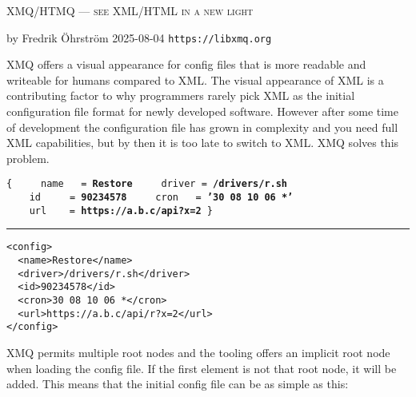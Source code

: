 \documentclass[10pt,a4paper]{article}
\newcommand{\xmqEN}[1]{{\color{xmqEN}#1}}
\newcommand{\xmqEK}[1]{{\color{xmqEK}#1}}
\newcommand{\xmqEKV}[1]{{\color{xmqEKV}\textbf{#1}}}
\newcommand{\xmqI}[0]{{\mbox{\ }}}
\begin{document}
{\flushleft
{\textsc{\Large XMQ/HTMQ --- see XML/HTML in a new light}}

by Fredrik Öhrström 2025-08-04 \hfill \texttt{https://libxmq.org}
}

{\flushleft{\large\textsc{\color{Red}{Rationale}}}} XMQ offers a visual
appearance for config files that is more readable and writeable for humans compared
to XML. The visual appearance of XML is a contributing factor to why programmers
rarely pick XML as the initial configuration file format for newly developed software.
However after some time of development the configuration file has grown in complexity
and you need full XML capabilities, but by then it is too late to switch to XML. XMQ solves this problem.

\begin{minipage}[b][27mm][b]{6cm}
\texttt{\flushleft\noindent \xmqEN{config}\xmqI \{\linebreak
\xmqI \xmqI \xmqI \xmqI \xmqEK{name}\xmqI \xmqI \xmqI =\xmqI \xmqEKV{Restore}\linebreak
\xmqI \xmqI \xmqI \xmqI \xmqEK{driver}\xmqI =\xmqI \xmqEKV{/drivers/r.sh}\linebreak
\xmqI \xmqI \xmqI \xmqI \xmqEK{id}\xmqI \xmqI \xmqI \xmqI \xmqI =\xmqI \xmqEKV{90234578}\linebreak
\xmqI \xmqI \xmqI \xmqI \xmqEK{cron}\xmqI \xmqI \xmqI =\xmqI \xmqEKV{'}\xmqEKV{30 08 10 06 *}\xmqEKV{'}\linebreak
\xmqI \xmqI \xmqI \xmqI \xmqEK{url}\xmqI \xmqI \xmqI \xmqI =\xmqI \xmqEKV{https://a.b.c/api?x=2}\linebreak
\}
}
\end{minipage}
\rule{5mm}{0cm}
\begin{minipage}[b][27mm][b]{6cm}
\verb|<config>|\\
\verb|  <name>Restore</name>|\\
\verb|  <driver>/drivers/r.sh</driver>|\\
\verb|  <id>90234578</id>|\\
\verb|  <cron>30 08 10 06 *</cron>|\\
\verb|  <url>https://a.b.c/api/r?x=2</url>|\\
\verb|</config>|
\end{minipage}

{\flushleft{\large\textsc{\color{Red}{Tooling}}}} XMQ permits multiple root nodes
and the tooling offers an implicit root node when loading the config file. If the
first element is not that root node, it will be added. This means that the initial
config file can be as simple as this:
\end{document}
